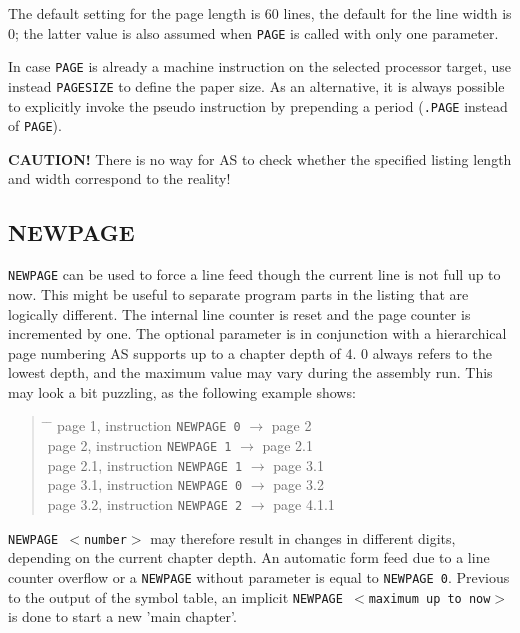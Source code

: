 \documentclass[12pt,twoside]{report}
\makeatletter
\newcommand{\bb}[1]{{\bf #1}}
\newcommand{\tty}[1]{{\tt #1}}
\newcommand{\ttindex}[1]{\index{#1@{\tt #1}}}
\newcommand{\asname}{{AS}}
\makeatother
\begin{document}
The default setting for the page length is 60 lines, the default for the
line width is 0; the latter value is also assumed when \tty{PAGE} is
called with only one parameter.

In case \tty{PAGE} is already a machine instruction on the
selected processor target, use instead \tty{PAGESIZE} to define
the paper size.  As an alternative, it is always possible to explicitly
invoke the pseudo instruction by prepending a period (\tty{.PAGE} instead
of \tty{PAGE}).

\bb{CAUTION!}  There is no way for \asname{} to check whether the specified
listing length and width correspond to the reality!


\subsection{NEWPAGE}
\ttindex{NEWPAGE}

\tty{NEWPAGE} can be used to force a line feed though the current line is
not full up to now.  This might be useful to separate program parts
in the listing that are logically different.  The internal line
counter is reset and the page counter is incremented by one.  The
optional parameter is in conjunction with a hierarchical page
numbering \asname{} supports up to a chapter depth of 4.  0 always refers to
the lowest depth, and the maximum value may vary during the assembly
run.  This may look a bit puzzling, as the following example shows:
\begin{quote}\begin{tabbing}
\hspace{2.5cm} \= \hspace{4.5cm} \= \kill
page 1,   \> instruction \tty{NEWPAGE 0} \>  $\rightarrow$ page 2 \\
page 2,   \> instruction \tty{NEWPAGE 1} \>  $\rightarrow$ page 2.1 \\
page 2.1, \> instruction \tty{NEWPAGE 1} \>  $\rightarrow$ page 3.1 \\
page 3.1, \> instruction \tty{NEWPAGE 0} \>  $\rightarrow$ page 3.2 \\
page 3.2, \> instruction \tty{NEWPAGE 2} \>  $\rightarrow$ page 4.1.1 \\
\end{tabbing}\end{quote}
\tty{NEWPAGE $<$number$>$} may therefore result in
changes in different digits, depending on the current chapter depth.  An
automatic form feed due to a line counter overflow or a \tty{NEWPAGE}
without parameter is equal to \tty{NEWPAGE 0}.  Previous to the output of
the symbol table, an implicit \tty{NEWPAGE $<$maximum up to now$>$} is
done to start a new 'main chapter'.
\end{document}
